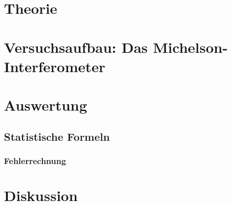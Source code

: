 \documentclass[a4,11pt]{article}
\newcommand{\V}{V401}
\begin{document}



\tableofcontents
\clearpage


\section{Theorie}

\clearpage


\section{Versuchsaufbau: Das Michelson-Interferometer}

\clearpage


\section{Auswertung}
\subsection{Statistische Formeln}
\subsubsection{Fehlerrechnung}
\label{sec:Fehlerrechnung}

%
\clearpage

\clearpage


\section{Diskussion}


\clearpage
\listoftodos
\listoffigures
\listoftables
\clearpage
\nocite{\V}
\printbibliography[title = Literaturverzeichnis]
\end{document}
